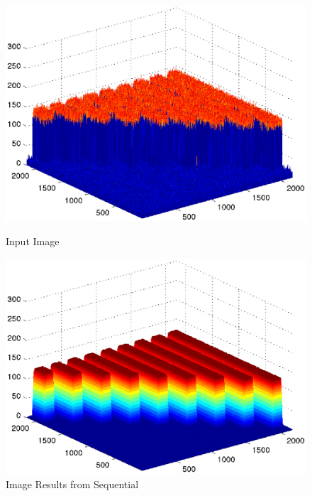 \documentclass{article}
\begin{document}
\begin{figure}[htbp]
\begin{minipage}[b]{0.5\linewidth}
\centering
\includegraphics[width=\linewidth]{Original-image.eps}
\caption{Input Image}
\label{fig:inpimg}
\end{minipage}
\hspace{0.5cm}
\begin{minipage}[b]{0.5\linewidth}
\centering
\includegraphics[width=\linewidth]{sequential-image.eps}
\caption{Image Results from Sequential}
\label{fig:seqimg}
\end{minipage}
\end{figure}
\end{document}
